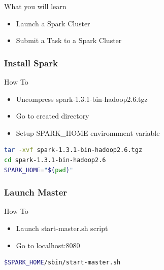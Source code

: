\documentclass[slidetop,9pt,utf8]{beamer}
\begin{document}
\begin{CJK}{UTF8}{gbsn}
\begin{frame}
  \begin{block}{What you will learn}
    \begin{itemize}
      \item Launch a Spark Cluster
      \item Submit a Task to a Spark Cluster
    \end{itemize}
  \end{block}

\end{frame}

\begin{frame}[fragile]

  \frametitle{Install Spark}

  \begin{block}{How To}
    \begin{itemize}
      \item Uncompress spark-1.3.1-bin-hadoop2.6.tgz
      \item Go to created directory
      \item Setup SPARK\_HOME environnment variable
    \end{itemize}
  \end{block}

  \begin{lstlisting}[language=bash, style=terminal-large]
tar -xvf spark-1.3.1-bin-hadoop2.6.tgz
cd spark-1.3.1-bin-hadoop2.6
SPARK_HOME="$(pwd)" 
  \end{lstlisting} 

\end{frame}

\begin{frame}[fragile]

  \frametitle{Launch Master}

  \begin{block}{How To}
    \begin{itemize}
      \item Launch start-master.sh script
      \item Go to localhost:8080
    \end{itemize}
  \end{block}

  \begin{lstlisting}[language=bash, style=terminal-large]
$SPARK_HOME/sbin/start-master.sh
  \end{lstlisting} 

\end{frame}

\begin{frame}


\end{frame}
\end{CJK}
\end{document}
